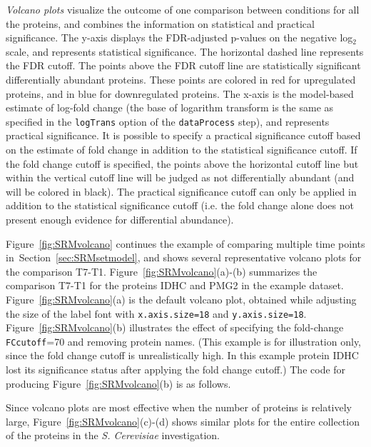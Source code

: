 \documentclass[11pt]{article}
\def\figref#1{Figure~\ref{fig:#1}}
\def\secref#1{Section~\ref{sec:#1}}
\begin{document}
{\it Volcano plots} visualize the outcome of one comparison between conditions for all the proteins, and combines the information on statistical and practical significance. The y-axis displays the FDR-adjusted p-values on the negative log$_2$ scale, and represents statistical significance. The horizontal dashed line represents the FDR cutoff. The points above the FDR cutoff line are statistically significant differentially abundant proteins. These points are colored in red for upregulated proteins, and in blue for downregulated proteins. The x-axis is the model-based estimate of log-fold change (the base of logarithm transform is the same as specified in the {\tt logTrans} option of the {\tt dataProcess} step), and represents practical significance. It is possible to specify a practical significance cutoff based on the estimate of fold change in addition to the statistical significance cutoff. If the fold change cutoff is specified, the points above the horizontal cutoff line but within the vertical cutoff line will be judged as not differentially abundant (and will be colored in black). The practical significance cutoff can only be applied in addition to the statistical significance cutoff (i.e. the fold change alone does not present enough evidence for differential abundance).

\figref{SRMvolcano} continues the example of comparing multiple time points in~\secref{SRMsetmodel}, and shows several representative volcano plots for the comparison T7-T1. \figref{SRMvolcano}(a)-(b) summarizes the comparison T7-T1 for the proteins IDHC and PMG2 in the example dataset. \figref{SRMvolcano}(a) is the default volcano plot, obtained while adjusting the size of the label font with {\tt x.axis.size=18} and {\tt y.axis.size=18}. \figref{SRMvolcano}(b) illustrates the effect of specifying the fold-change {\tt FCcutoff}=70 and removing protein names. (This example is for illustration only, since the fold change cutoff is unrealistically high. In this example protein IDHC lost its significance status after applying the fold change cutoff.) The code for producing \figref{SRMvolcano}(b) is as follows.

\begin{small}
\begin{Schunk}
\end{Schunk}
\end{small}
Since volcano plots are most effective when the number of proteins is relatively large, \figref{SRMvolcano}(c)-(d) shows similar plots for the entire collection of the proteins in the {\it S. Cerevisiae} investigation.
\end{document}
